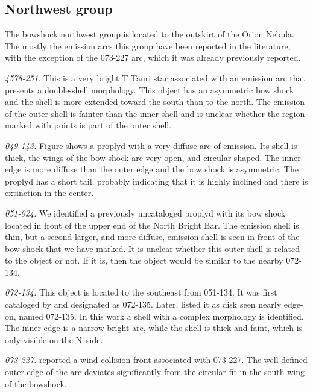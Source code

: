 \documentclass[apj, twocolumn]{aastex63}
\renewcommand\clearpage{}
\begin{document}
\clearpage
\subsection{Northwest group}
\label{sec:nw-group}



The bowshock northwest group is located to the outskirt of
the Orion Nebula. The mostly the emission arcs this group
have been reported in the literature, with the exception
of the  073-227 arc, which it was already previously reported.    

\textit{4578-251.} This is a very bright T Tauri star
associated with an emission arc that presents a double-shell
morphology. This object has an asymmetric bow shock and
the shell is more extended toward the south than to the north.
The emission of the outer shell is fainter than the inner
shell and is unclear whether the region marked with points
is part of the outer shell.

\textit{049-143.} Figure shows a proplyd \citep{Ricci:2008a}
with a very diffuse arc of emission. Its shell is thick,
the wings of the bow shock are very open, and circular
shaped. The inner edge is more diffuse than the outer edge
and the bow shock is asymmetric. The  proplyd has a short
tail, probably indicating that it is highly inclined and
there is extinction in the center. 
 
\textit{051-024.} We identified a previously uncataloged
proplyd with its bow shock located in front of the upper
end of the North Bright Bar. The emission shell is thin,
but a second larger, and more diffuse, emission shell is
seen in front of the bow shock that we have
marked. It is unclear whether this outer shell is related
to the object or not. If it is, then the object would be
similar to the nearby 072-134. 

\textit{072-134.} This object is located to the southeast
from 051-134. It was first cataloged by \citet{ODell:1996a}
and designated as 072-135. Later, \citet{Ricci:2008a} listed
it as disk seen nearly edge-on, named 072-135. In this work
a shell with a complex morphology is identified. The inner
edge is a narrow bright arc, while the shell is thick and
faint, which is only visible on the N~side.                 

\textit{073-227.} \citet{Bally:2000a} reported a wind
collision front associated with 073-227. The well-defined
outer edge of the arc deviates significantly from the
circular fit in the south wing of the bowshock.
   
\end{document}
